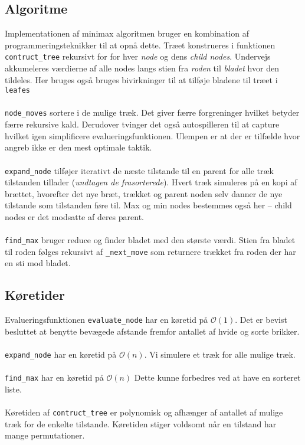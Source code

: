 \subsection{Algoritme}
Implementationen af minimax algoritmen bruger en kombination af programmeringsteknikker til at opnå dette.
Træet konstrueres i funktionen \texttt{contruct\_tree} rekursivt for for hver \textit{node} og dens \textit{child nodes}. Undervejs akkumeleres værdierne af 
alle nodes langs stien fra \textit{roden} til \textit{bladet} hvor den tildeles. Her bruges også
bruges bivirkninger til at tilføje bladene til træet i \texttt{leafes}\\
\\
\texttt{node\_moves} sortere i de mulige træk. Det giver færre forgreninger hvilket betyder færre rekursive kald.
Derudover tvinger det også autospilleren til at capture hvilket igen simplificere evalueringsfunktionen.
Ulempen er at der er tilfælde hvor angreb ikke er den mest optimale taktik.\\
\\
\texttt{expand\_node} tilføjer iterativt de næste tilstande til en parent for alle træk tilstanden
tillader (\textit{undtagen de frasorterede}). Hvert træk simuleres på en kopi af brættet, hvorefter det nye bræt, trækket og parent noden
selv danner de nye tilstande som tilstanden føre til. Max og min nodes bestemmes også her -- child nodes
er det modsatte af deres parent.\\
\\
\texttt{find\_max} bruger reduce og finder bladet med den største værdi. Stien fra bladet til
roden følges rekursivt af \texttt{\_next\_move} som returnere trækket fra roden der har en sti
mod bladet.

\subsection{Køretider}
Evalueringsfunktionen \texttt{evaluate\_node} har en køretid på $\mathcal{O}(1)$.
Det er bevist besluttet at benytte bevægede afstande fremfor antallet af hvide og sorte brikker.\\
\\
\texttt{expand\_node} har en køretid på $\mathcal{O}(n)$. Vi simulere et træk for
alle mulige træk.\\
\\
\texttt{find\_max} har en køretid på $\mathcal{O}(n)$ Dette kunne forbedres ved at have en sorteret liste.\\
\\
Køretiden af \texttt{contruct\_tree} er polynomisk og afhænger af antallet af mulige træk for de
enkelte tilstande. Køretiden stiger voldsomt når en tilstand har mange permutationer.

